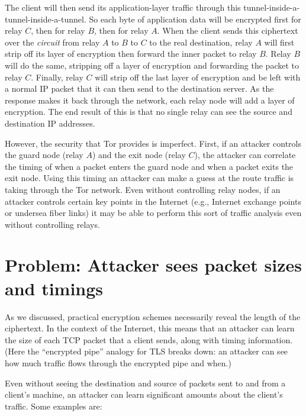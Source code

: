 \documentclass[
  letterpaper,
]{scrbook}
\theoremstyle{definition}
\theoremstyle{plain}
\theoremstyle{plain}
\theoremstyle{remark}
\begin{document}
The client will then send its application-layer traffic through this
tunnel-inside-a-tunnel-inside-a-tunnel. So each byte of application data
will be encrypted first for relay \(C\), then for relay \(B\), then for
relay \(A\). When the client sends this ciphertext over the
\emph{circuit} from relay \(A\) to \(B\) to \(C\) to the real
destination, relay \(A\) will first strip off its layer of encryption
then forward the inner packet to relay \(B\). Relay \(B\) will do the
same, stripping off a layer of encryption and forwarding the packet to
relay \(C\). Finally, relay \(C\) will strip off the last layer of
encryption and be left with a normal IP packet that it can then send to
the destination server. As the response makes it back through the
network, each relay node will add a layer of encryption. The end result
of this is that no single relay can see the source and destination IP
addresses.

However, the security that Tor provides is imperfect. First, if an
attacker controls the guard node (relay \(A\)) and the exit node (relay
\(C\)), the attacker can correlate the timing of when a packet enters
the guard node and when a packet exits the exit node. Using this timing
an attacker can make a guess at the route traffic is taking through the
Tor network. Even without controlling relay nodes, if an attacker
controls certain key points in the Internet (e.g., Internet exchange
points or undersea fiber links) it may be able to perform this sort of
traffic analysis even without controlling relays.

\section{Problem: Attacker sees packet sizes and
timings}\label{problem-attacker-sees-packet-sizes-and-timings}

As we discussed, practical encryption schemes necessarily reveal the
length of the ciphertext. In the context of the Internet, this means
that an attacker can learn the size of each TCP packet that a client
sends, along with timing information. (Here the ``encrypted pipe''
analogy for TLS breaks down: an attacker can see how much traffic flows
through the encrypted pipe and when.)

Even without seeing the destination and source of packets sent to and
from a client's machine, an attacker can learn significant amounts about
the client's traffic. Some examples are:
\end{document}
